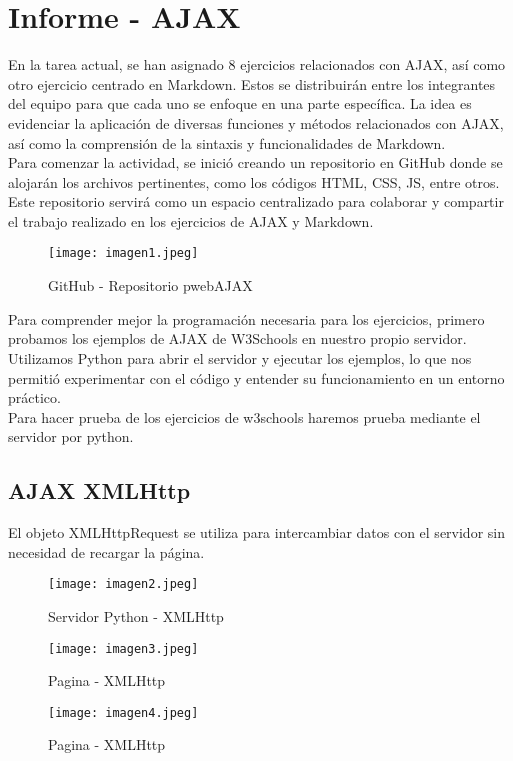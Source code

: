 \documentclass[10pt, a4paper]{article}
\begin{document}
\section*{\centering Informe - AJAX}
	\begin{flushleft}
		En la tarea actual, se han asignado 8 ejercicios relacionados con AJAX, así como otro ejercicio centrado en Markdown. Estos se distribuirán entre los integrantes del equipo para que cada uno se enfoque en una parte específica. La idea es evidenciar la aplicación de diversas funciones y métodos relacionados con AJAX, así como la comprensión de la sintaxis y funcionalidades de Markdown. \\
		Para comenzar la actividad, se inició creando un repositorio en GitHub donde se alojarán los archivos pertinentes, como los códigos HTML, CSS, JS, entre otros. Este repositorio servirá como un espacio centralizado para colaborar y compartir el trabajo realizado en los ejercicios de AJAX y Markdown. 
	\end{flushleft}
	\begin{figure}[h]
		\centering
		\texttt{[image: imagen1.jpeg]}
		\caption{GitHub - Repositorio pwebAJAX}
	\end{figure}
	\begin{flushleft}
		Para comprender mejor la programación necesaria para los ejercicios, primero probamos los ejemplos de AJAX de W3Schools en nuestro propio servidor. Utilizamos Python para abrir el servidor y ejecutar los ejemplos, lo que nos permitió experimentar con el código y entender su funcionamiento en un entorno práctico. \\
		Para hacer prueba de los ejercicios de w3schools haremos prueba mediante el servidor por python.
	\end{flushleft}
	\subsection*{AJAX XMLHttp}
	\begin{flushleft}
		El objeto XMLHttpRequest se utiliza para intercambiar datos con el servidor sin necesidad de recargar la página.
	\end{flushleft}
	\begin{figure}[h]
		\centering
		\texttt{[image: imagen2.jpeg]}
		\caption{Servidor Python - XMLHttp}
	\end{figure}
	\begin{figure}[h]
		\centering
		\texttt{[image: imagen3.jpeg]}
		\caption{Pagina - XMLHttp}
	\end{figure} 
	\begin{figure}[h]
		\centering
		\texttt{[image: imagen4.jpeg]}
		\caption{Pagina - XMLHttp}
	\end{figure}
\end{document}
